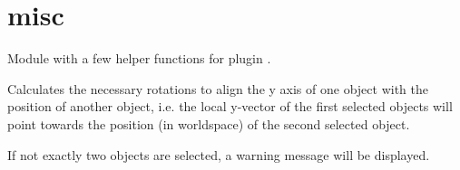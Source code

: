 \documentclass[letterpaper,10pt,english]{sphinxmanual}
\begin{document}
\section{misc}
\label{\detokenize{pk_src.misc:misc}}\label{\detokenize{pk_src.misc::doc}}\label{\detokenize{pk_src.misc:id1}}
{\hyperref[\detokenize{index:sec-misc}]{}}
\label{\detokenize{pk_src.misc:module-pk_src.misc}}
Module with a few helper functions for plugin .

\begin{fulllineitems}
\label{\detokenize{pk_src.misc:pk_src.misc.alignYAxis}}
Calculates the necessary rotations to align the y axis of one object with the position of another object, i.e. the local y-vector of the first selected objects will point towards the position (in worldspace) of the second selected object.

If not exactly two objects are selected, a warning message will be displayed.

\end{fulllineitems}

\end{document}
